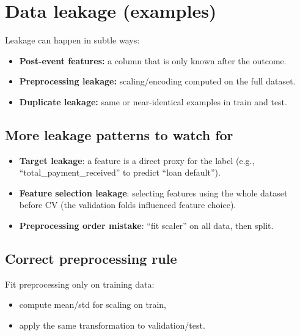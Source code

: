 \documentclass[11pt]{article}
\begin{document}
\section{Data leakage (examples)}
Leakage can happen in subtle ways:
\begin{itemize}[leftmargin=*]
  \item \textbf{Post-event features:} a column that is only known after the outcome.
  \item \textbf{Preprocessing leakage:} scaling/encoding computed on the full dataset.
  \item \textbf{Duplicate leakage:} same or near-identical examples in train and test.
\end{itemize}

\subsection{More leakage patterns to watch for}
\begin{itemize}[leftmargin=*]
  \item \textbf{Target leakage}: a feature is a direct proxy for the label (e.g., ``total\_payment\_received'' to predict ``loan default'').
  \item \textbf{Feature selection leakage}: selecting features using the whole dataset before CV (the validation folds influenced feature choice).
  \item \textbf{Preprocessing order mistake}: ``fit scaler'' on all data, then split.
\end{itemize}

\subsection{Correct preprocessing rule}
Fit preprocessing only on training data:
\begin{itemize}[leftmargin=*]
  \item compute mean/std for scaling on train,
  \item apply the same transformation to validation/test.
\end{itemize}
\end{document}
